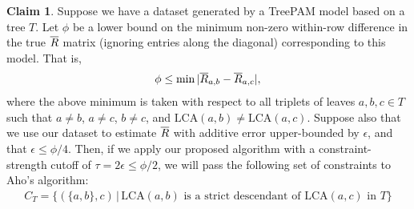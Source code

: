 \documentclass{article}
\theoremstyle{definition}
\newtheorem{claim}[thm]{Claim}
\newcommand{\LCA}{\text{LCA}}
\begin{document}
\begin{claim}
Suppose we have a dataset generated by a TreePAM model based on a tree $T$.
Let $\phi$ be a lower bound on the minimum non-zero within-row difference in the true $\overline{R}$ matrix (ignoring entries along the diagonal) corresponding to this model.
That is,
\begin{align*}
\phi \leq \min |\overline{R}_{a,b} - \overline{R}_{a,c}|,
\end{align*}
where the above minimum is taken with respect to all triplets of leaves $a, b, c \in T$ such that $a \neq b$, $a \neq c$, $b \neq c$, and $\LCA(a,b) \neq \LCA(a,c)$.
Suppose also that we use our dataset to estimate $\overline{R}$ with additive error upper-bounded by $\epsilon$, and that $\epsilon \leq \phi/4$.
Then, if we apply our proposed algorithm with a constraint-strength cutoff of $\tau = 2\epsilon \leq \phi/2$, we will pass the following set of constraints to Aho's algorithm:
\begin{align*}
C_T = \{ (\{a,b\},c) \,|\, \LCA(a,b) \text{ is a strict descendant of } \LCA(a,c) \text{ in } T \}
\end{align*}
\end{claim}
\end{document}
